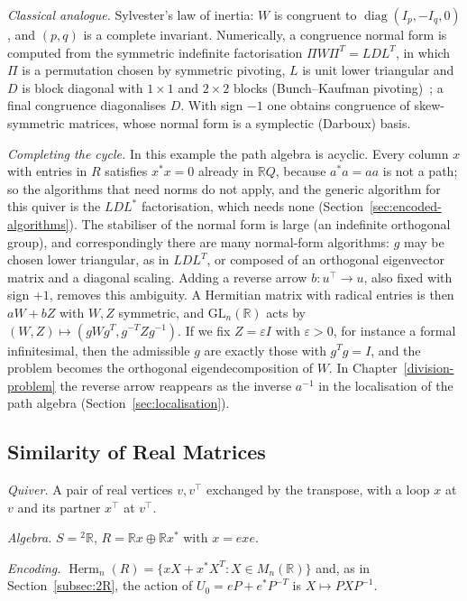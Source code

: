 \documentclass[12pt, a4paper]{report}
\theoremstyle{plain}
\theoremstyle{definition}
\theoremstyle{remark}
\theoremstyle{plain}
\newcommand{\RR}{\mathbb{R}}
\newcommand{\GL}{\mathrm{GL}}
\newcommand{\Herm}{\operatorname{Herm}}
\newcommand{\twoR}{{}^{2}\mathbb{R}}
\DeclareMathOperator{\diag}{diag}
\begin{document}
\emph{Classical analogue.} Sylvester's law of inertia: $W$ is congruent to $\diag(I_p,-I_q,0)$, and $(p,q)$ is a complete invariant. Numerically, a congruence normal form is computed from the symmetric indefinite factorisation $\Pi W\Pi^T=LDL^T$, in which $\Pi$ is a permutation chosen by symmetric pivoting, $L$ is unit lower triangular and $D$ is block diagonal with $1\times1$ and $2\times2$ blocks (Bunch--Kaufman pivoting)~\cite{GolubVanLoan2013}; a final congruence diagonalises $D$. With sign $-1$ one obtains congruence of skew-symmetric matrices, whose normal form is a symplectic (Darboux) basis.

\emph{Completing the cycle.} In this example the path algebra is acyclic. Every column $x$ with entries in $R$ satisfies $x^*x=0$ already in $\RR Q$, because $a^*a=aa$ is not a path; so the algorithms that need norms do not apply, and the generic algorithm for this quiver is the $LDL^*$ factorisation, which needs none (Section~\ref{sec:encoded-algorithms}). The stabiliser of the normal form is large (an indefinite orthogonal group), and correspondingly there are many normal-form algorithms: $g$ may be chosen lower triangular, as in $LDL^T$, or composed of an orthogonal eigenvector matrix and a diagonal scaling. Adding a reverse arrow $b:u^{\top}\to u$, also fixed with sign $+1$, removes this ambiguity. A Hermitian matrix with radical entries is then $aW+bZ$ with $W,Z$ symmetric, and $\GL_n(\RR)$ acts by $(W,Z)\mapsto(gWg^T,g^{-T}Zg^{-1})$. If we fix $Z=\varepsilon I$ with $\varepsilon>0$, for instance a formal infinitesimal, then the admissible $g$ are exactly those with $g^Tg=I$, and the problem becomes the orthogonal eigendecomposition of $W$. In Chapter~\ref{division-problem} the reverse arrow reappears as the inverse $a^{-1}$ in the localisation of the path algebra (Section~\ref{sec:localisation}).

\subsection{Similarity of Real Matrices}
\label{subsec:cat-similarity}
\emph{Quiver.} A pair of real vertices $v,v^{\top}$ exchanged by the transpose, with a loop $x$ at $v$ and its partner $x^{\top}$ at $v^{\top}$.

\emph{Algebra.} $S=\twoR$, $R=\RR x\oplus\RR x^*$ with $x=exe$.

\emph{Encoding.} $\Herm_n(R)=\{xX+x^*X^T:X\in M_n(\RR)\}$ and, as in Section~\ref{subsec:2R}, the action of $U_0=eP+e^*P^{-T}$ is $X\mapsto PXP^{-1}$.
\end{document}
